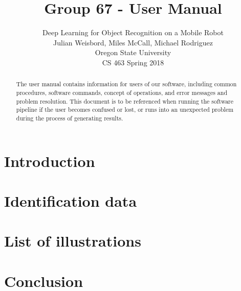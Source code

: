 \documentclass[draftclsnofoot, onecolumn, 10pt, compsoc]{IEEEtran}
\title{Group 67 - User Manual}
\author{
            Deep Learning for Object Recognition on a Mobile Robot \\
            Julian Weisbord, Miles McCall, Michael Rodriguez \\
            Oregon State University \\
            CS 463 Spring 2018
		}
\begin{document}
\maketitle

\begin{abstract}
The user manual contains information for users of our software, including common procedures, software commands, concept of operations, and error messages and problem resolution. This document is to be referenced when running the software pipeline if the user becomes confused or lost, or runs into an unexpected problem during the process of generating results. 
\end{abstract}
\newpage

\tableofcontents
\newpage

\section{Introduction}

\section{Identification data}
\section{List of illustrations}
\section{}
\section{}
\section{}
\section{}
\section{}
\section{}

\section{Conclusion}



\end{document}
